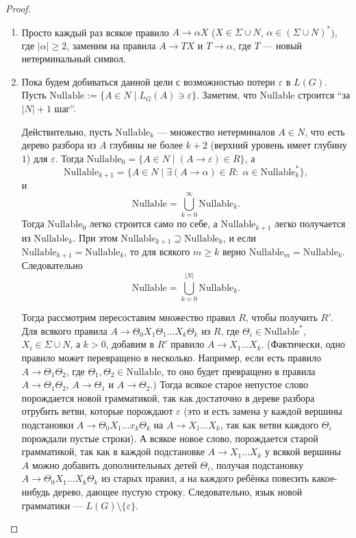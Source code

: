 \documentclass[12pt,a4paper]{article}
\begin{document}
    \begin{proof}
        \newcommand{\Nullable}{\mathrm{Nullable}}
        \begin{enumerate}
            \item Просто каждый раз всякое правило $A \to \alpha X$ ($X \in \Sigma \cup N$, $\alpha \in (\Sigma \cup N)^*$), где $|\alpha| \geqslant 2$, заменим на правила $A \to TX$ и $T \to \alpha$, где $T$ --- новый нетерминальный символ.

            \item Пока будем добиваться данной цели с возможностью потери $\varepsilon$ в $L(G)$. Пусть $\Nullable := \{A \in N \mid L_G(A) \ni \varepsilon\}$. Заметим, что $\Nullable$ строится ``за $|N|+1$ шаг''.
            
                Действительно, пусть $\Nullable_k$ --- множество нетерминалов $A \in N$, что есть дерево разбора из $A$ глубины не более $k+2$ (верхний уровень имеет глубину $1$) для $\varepsilon$. Тогда $\Nullable_0 = \{A \in N \mid (A \to \varepsilon) \in R\}$, а
                \[\Nullable_{k+1} = \{A \in N \mid \exists (A \to \alpha) \in R\colon \; \alpha \in \Nullable_k^*\},\]
                и
                \[\Nullable = \bigcup_{k=0}^\infty \Nullable_k.\]
                Тогда $\Nullable_0$ легко строится само по себе, а $\Nullable_{k+1}$ легко получается из $\Nullable_k$. При этом $\Nullable_{k+1} \supseteq \Nullable_k$, и если $\Nullable_{k+1} = \Nullable_k$, то для всякого $m \geqslant k$ верно $\Nullable_m = \Nullable_k$. Следовательно
                \[\Nullable = \bigcup_{k=0}^{|N|} \Nullable_k.\]

                Тогда рассмотрим пересоставим множество правил $R$, чтобы получить $R'$. Для всякого правила $A \to \Theta_0 X_1 \Theta_1 \dots X_k \Theta_k$ из $R$, где $\Theta_i \in \Nullable^*$, $X_i \in \Sigma \cup N$, а $k > 0$, добавим в $R'$ правило $A \to X_1 \dots X_k$. (Фактически, одно правило может перевращено в несколько. Например, если есть правило $A \to \Theta_1 \Theta_2$, где $\Theta_1, \Theta_2 \in \Nullable$, то оно будет превращено в правила $A \to \Theta_1 \Theta_2$, $A \to \Theta_1$ и $A \to \Theta_2$.) Тогда всякое старое непустое слово порождается новой грамматикой, так как достаточно в дереве разбора отрубить ветви, которые порождают $\varepsilon$ (это и есть замена у каждой вершины подстановки $A \to \Theta_0 X_1 \dots x_k \Theta_k$ на $A \to X_1 \dots X_k$, так как ветви каждого $\Theta_i$ порождали пустые строки). А всякое новое слово, порождается старой грамматикой, так как в каждой подстановке $A \to X_1 \dots X_k$ у всякой вершины $A$ можно добавить дополнительных детей $\Theta_i$, получая подстановку $A \to \Theta_0 X_1 \dots X_k \Theta_k$ из старых правил, а на каждого ребёнка повесить какое-нибудь дерево, дающее пустую строку. Следовательно, язык новой грамматики --- $L(G) \setminus \{\varepsilon\}$.


\end{enumerate}
\end{proof}
\end{document}
